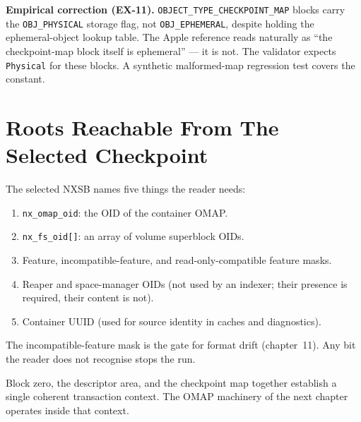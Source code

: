 \textbf{Empirical correction (EX-11).}
\texttt{OBJECT\_TYPE\_CHECKPOINT\_MAP} blocks carry the
\texttt{OBJ\_PHYSICAL} storage flag, not \texttt{OBJ\_EPHEMERAL},
despite holding the ephemeral-object lookup table. The Apple
reference reads naturally as ``the checkpoint-map block itself is
ephemeral'' --- it is not. The validator expects
\texttt{Physical} for these blocks. A synthetic malformed-map
regression test covers the constant.

\section{Roots Reachable From The Selected Checkpoint}

The selected NXSB names five things the reader needs:

\begin{enumerate}
  \item \texttt{nx\_omap\_oid}: the OID of the container OMAP.
  \item \texttt{nx\_fs\_oid[]}: an array of volume superblock OIDs.
  \item Feature, incompatible-feature, and read-only-compatible
    feature masks.
  \item Reaper and space-manager OIDs (not used by an indexer;
    their presence
    is required, their content is not).
  \item Container UUID (used for source identity in caches and
    diagnostics).
\end{enumerate}

The incompatible-feature mask is the gate for format drift
(chapter~11). Any bit the reader does not recognise stops the run.

Block zero, the descriptor area, and the checkpoint map together
establish a single coherent transaction context. The OMAP
machinery of the next chapter operates inside that context.
